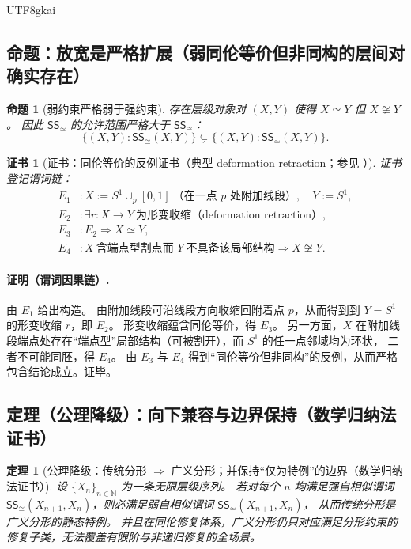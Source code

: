 \documentclass[12pt]{article}
\newtheorem{theorem}{定理}[section]
\newtheorem{proposition}{命题}[section]
\newtheorem{Certificate}{证书}[section]
\newcommand{\NN}{\mathbb{N}}
\newcommand{\KouJing}{\texorpdfstring{表述约定}{表述约定}}
\begin{document}
\begin{CJK*}{UTF8}{gkai}
\subsection{命题：放宽是严格扩展（弱同伦等价但非同构的层间对确实存在）}
\label{subsec:tex29-weak-strictly-larger}

\begin{proposition}[弱约束严格弱于强约束]
\label{prop:tex29-weak-strictly-larger}
存在层级对象对 $(X,Y)$ 使得 $X\simeq Y$ 但 $X\not\cong Y$。
因此 $\mathsf{SS}_{\simeq}$ 的允许范围严格大于 $\mathsf{SS}_{\cong}$：
\[
  \{(X,Y):\mathsf{SS}_{\cong}(X,Y)\}\subsetneq \{(X,Y):\mathsf{SS}_{\simeq}(X,Y)\}.
\]
\end{proposition}

\begin{Certificate}[证书：同伦等价的反例证书（典型 deformation retraction；参见 \cite{Hatcher2002AT}）]
\label{cert:tex29-weak-strictly-larger}
证书登记谓词链：
\[
\begin{aligned}
  E_1 &: X:=S^1\cup_{p}[0,1]\ \text{（在一点 }p\text{ 处附加线段）},\quad Y:=S^1,\\
  E_2 &: \exists r:X\to Y\ \text{为形变收缩（deformation retraction）},\\
  E_3 &: E_2 \Rightarrow X\simeq Y,\\
  E_4 &: X\ \text{含端点型割点而 }Y\ \text{不具备该局部结构}\Rightarrow X\not\cong Y.
\end{aligned}
\]
\end{Certificate}

\paragraph{证明（谓词因果链）.}
由 $E_1$ 给出构造。
由附加线段可沿线段方向收缩回附着点 $p$，从而得到到 $Y=S^1$ 的形变收缩 $r$，即 $E_2$。
形变收缩蕴含同伦等价，得 $E_3$。
另一方面，$X$ 在附加线段端点处存在“端点型”局部结构（可被割开），而 $S^1$ 的任一点邻域均为环状，
二者不可能同胚，得 $E_4$。
由 $E_3$ 与 $E_4$ 得到“同伦等价但非同构”的反例，从而严格包含结论成立。证毕。

\subsection{定理（公理降级）：向下兼容与边界保持（数学归纳法证书）}
\label{subsec:tex29-compatibility-and-boundary}

\begin{theorem}[公理降级：传统分形 $\Rightarrow$ 广义分形；并保持“仅为特例”的边界（数学归纳法证书）]
\label{thm:tex29-paradigm-extension}
设 $\{X_n\}_{n\in\NN}$ 为一条无限层级序列。
若对每个 $n$ 均满足强自相似谓词 $\mathsf{SS}_{\cong}(X_{n+1},X_n)$，则必满足弱自相似谓词 $\mathsf{SS}_{\simeq}(X_{n+1},X_n)$，
从而传统分形是广义分形的静态特例。
并且在同伦修复体系，广义分形仍只对应满足分形约束的修复子类，无法覆盖有限阶与非递归修复的全场景。
\end{theorem}


\end{CJK*}
\end{document}
